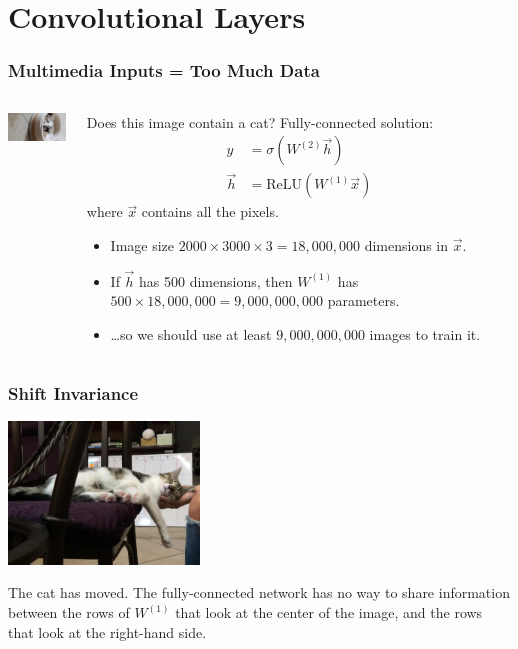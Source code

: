 \documentclass{beamer}
\begin{document}
\section[Convolution]{Convolutional Layers}
\setcounter{subsection}{1}

\begin{frame}
  \frametitle{Multimedia Inputs = Too Much Data}
  \begin{columns}[t]
    \column{1in}
    \begin{block}{}
      \centerline{\includegraphics[width=0.8in]{figs/kitten.jpg}}
    \end{block}
    \column{3.5in}
    \begin{block}{Does this image contain a  cat?}
      Fully-connected solution:
      \begin{align*}
        \hat{y} &=\sigma\left(W^{(2)}\vec{h}\right)\\
        \vec{h} &= \mbox{ReLU}\left(W^{(1)}\vec{x}\right)
      \end{align*}
      where $\vec{x}$ contains all the pixels.
      \begin{itemize}
      \item Image size $2000\times 3000\times 3=18,000,000$ dimensions in $\vec{x}$.
      \item If $\vec{h}$ has 500 dimensions, then $W^{(1)}$ has
        $500\times 18,000,000=9,000,000,000$ parameters.
      \item \ldots so we should use at least $9,000,000,000$ images to train it.
      \end{itemize}
    \end{block}
  \end{columns}
\end{frame}

\begin{frame}
  \frametitle{Shift Invariance}
  \centerline{\includegraphics[height=1.5in]{figs/IMG-20200826-WA0000.jpg}}
    The cat has moved.  The fully-connected network has no way to
    share information between the rows of $W^{(1)}$ that look at the
    center of the image, and the rows that look at the right-hand side.
\end{frame}
\end{document}
